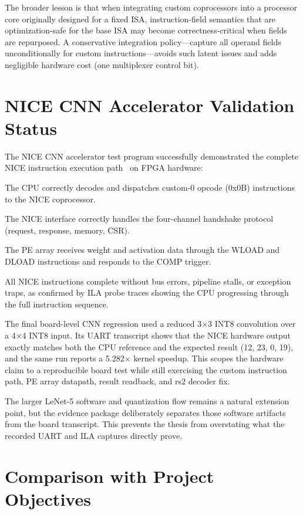 The broader lesson is that when integrating custom coprocessors into a processor core originally designed for a fixed ISA, instruction-field semantics that are optimization-safe for the base ISA may become correctness-critical when fields are repurposed. A conservative integration policy---capture all operand fields unconditionally for custom instructions---avoids such latent issues and adds negligible hardware cost (one multiplexer control bit).


\section{NICE CNN Accelerator Validation Status}\label{sec:5_2}

The NICE CNN accelerator test program successfully demonstrated the complete NICE instruction execution path~\cite{NUCLEI_NICE} on FPGA hardware:


The CPU correctly decodes and dispatches custom-0 opcode (0x0B) instructions to the NICE coprocessor.


The NICE interface correctly handles the four-channel handshake protocol (request, response, memory, CSR).


The PE array receives weight and activation data through the WLOAD and DLOAD instructions and responds to the COMP trigger.


All NICE instructions complete without bus errors, pipeline stalls, or exception traps, as confirmed by ILA probe traces showing the CPU progressing through the full instruction sequence.


The final board-level CNN regression used a reduced 3$\times$3 INT8 convolution over a 4$\times$4 INT8 input. Its UART transcript shows that the NICE hardware output exactly matches both the CPU reference and the expected result (12, 23, 0, 19), and the same run reports a 5.282$\times$ kernel speedup. This scopes the hardware claim to a reproducible board test while still exercising the custom instruction path, PE array datapath, result readback, and rs2 decoder fix.

The larger LeNet-5 software and quantization flow remains a natural extension point, but the evidence package deliberately separates those software artifacts from the board transcript. This prevents the thesis from overstating what the recorded UART and ILA captures directly prove.


\section{Comparison with Project Objectives}\label{sec:5_3}

